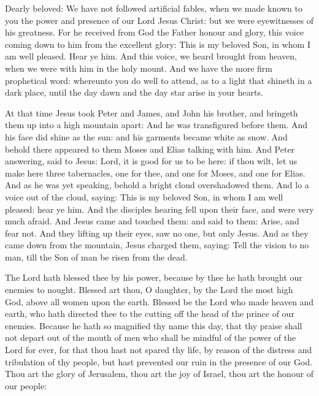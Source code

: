 
Dearly beloved:
We have not followed artificial fables, when we made known to you
the power and presence of our Lord Jesus Christ: but we were
eyewitnesses of his greatness.
For he received from God the Father honour and glory, this voice
coming down to him from the excellent glory: This is my beloved Son, in
whom I am well pleased. Hear ye him.
And this voice, we heard brought from heaven, when we were with
him in the holy mount.
And we have the more firm prophetical word: whereunto you do well
to attend, as to a light that shineth in a dark place, until the day
dawn and the day star arise in your hearts.



At that time Jesus took Peter and James, and John his brother,
and bringeth them up into a high mountain apart: And he was transfigured before
them. And his face did shine as the sun: and his garments became white as snow.
And behold there appeared to them Moses and Elias talking with him.  And Peter
answering, said to Jesus: Lord, it is good for us to be here: if thou wilt, let
us make here three tabernacles, one for thee, and one for Moses, and one for
Elias.  And as he was yet speaking, behold a bright cloud overshadowed them.
And lo a voice out of the cloud, saying: This is my beloved Son, in whom I am
well pleased: hear ye him.  And the disciples hearing fell upon their face, and
were very much afraid.  And Jesus came and touched them: and said to them:
Arise, and fear not.  And they lifting up their eyes, saw no one, but only
Jesus.  And as they came down from the mountain, Jesus charged them, saying:
Tell the vision to no man, till the Son of man be risen from the dead.






The Lord hath
blessed thee by his power, because by thee he hath brought our enemies
to nought.
Blessed art thou, O daughter, by the Lord the most high God, above all
women upon the earth.
Blessed be the Lord who made heaven and earth, who hath directed
thee to the cutting off the head of the prince of our enemies.
Because he hath so magnified thy name this day, that thy praise
shall not depart out of the mouth of men who shall be mindful of the
power of the Lord for ever, for that thou hast not spared thy life, by
reason of the distress and tribulation of thy people, but hast prevented
our ruin in the presence of our God.
Thou art the glory of Jerusalem, thou art the joy of
Israel, thou art the honour of our people:



